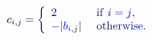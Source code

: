 \documentclass[12pt]{article}
\begin{document}
\makeatletter
\renewcommand*{\@textcolor}[3]{%
  \protect\leavevmode
  \begingroup
    \color#1{#2}#3%
  \endgroup
}
\makeatother
\begin{displaymath}
\mathcolor[RGB]{0,0,15}{c} _ { \mathcolor[RGB]{0,0,30}{i} \mathcolor[RGB]{0,0,45}{,} \mathcolor[RGB]{0,0,60}{j} } \mathcolor[RGB]{0,0,75}{=} \mathcolor[RGB]{0,0,90}{\left\{} \begin{array} {ll} { \mathcolor[RGB]{0,0,105}{2} } & { \mathrm { ~ \mathcolor[RGB]{0,0,120}{i} \mathcolor[RGB]{0,0,135}{f} ~ } \mathcolor[RGB]{0,0,150}{i} \mathcolor[RGB]{0,0,165}{=} \mathcolor[RGB]{0,0,180}{j} \mathcolor[RGB]{0,0,195}{,} } \\ { \mathcolor[RGB]{0,0,210}{-} \mathcolor[RGB]{0,0,225}{|} \mathcolor[RGB]{0,0,240}{b} _ { \mathcolor[RGB]{0,0,255}{i} \mathcolor[RGB]{0,15,0}{,} \mathcolor[RGB]{0,15,15}{j} } \mathcolor[RGB]{0,15,30}{|} } & { \mathrm { ~ \mathcolor[RGB]{0,15,45}{o} \mathcolor[RGB]{0,15,60}{t} \mathcolor[RGB]{0,15,75}{h} \mathcolor[RGB]{0,15,90}{e} \mathcolor[RGB]{0,15,105}{r} \mathcolor[RGB]{0,15,120}{w} \mathcolor[RGB]{0,15,135}{i} \mathcolor[RGB]{0,15,150}{s} \mathcolor[RGB]{0,15,165}{e} \mathcolor[RGB]{0,15,180}{.} } } \end{array} \mathcolor[RGB]{0,15,195}{\right.}
\end{displaymath}
\end{document}
